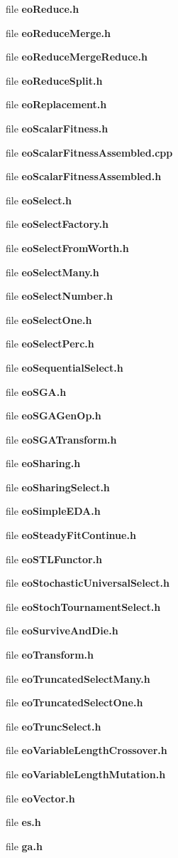 \begin{CompactItemize}
\item 
file {\bf eoReduce.h}
\item 
file {\bf eoReduceMerge.h}
\item 
file {\bf eoReduceMergeReduce.h}
\item 
file {\bf eoReduceSplit.h}
\item 
file {\bf eoReplacement.h}
\item 
file {\bf eoScalarFitness.h}
\item 
file {\bf eoScalarFitnessAssembled.cpp}
\item 
file {\bf eoScalarFitnessAssembled.h}
\item 
file {\bf eoSelect.h}
\item 
file {\bf eoSelectFactory.h}
\item 
file {\bf eoSelectFromWorth.h}
\item 
file {\bf eoSelectMany.h}
\item 
file {\bf eoSelectNumber.h}
\item 
file {\bf eoSelectOne.h}
\item 
file {\bf eoSelectPerc.h}
\item 
file {\bf eoSequentialSelect.h}
\item 
file {\bf eoSGA.h}
\item 
file {\bf eoSGAGenOp.h}
\item 
file {\bf eoSGATransform.h}
\item 
file {\bf eoSharing.h}
\item 
file {\bf eoSharingSelect.h}
\item 
file {\bf eoSimpleEDA.h}
\item 
file {\bf eoSteadyFitContinue.h}
\item 
file {\bf eoSTLFunctor.h}
\item 
file {\bf eoStochasticUniversalSelect.h}
\item 
file {\bf eoStochTournamentSelect.h}
\item 
file {\bf eoSurviveAndDie.h}
\item 
file {\bf eoTransform.h}
\item 
file {\bf eoTruncatedSelectMany.h}
\item 
file {\bf eoTruncatedSelectOne.h}
\item 
file {\bf eoTruncSelect.h}
\item 
file {\bf eoVariableLengthCrossover.h}
\item 
file {\bf eoVariableLengthMutation.h}
\item 
file {\bf eoVector.h}
\item 
file {\bf es.h}
\item 
file {\bf ga.h}
\end{CompactItemize}

